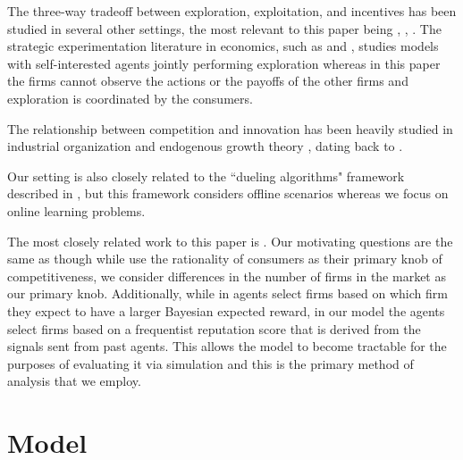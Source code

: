 \documentclass{article}
\theoremstyle{definition}
\begin{document}
The three-way tradeoff between exploration, exploitation, and incentives has been studied in several other settings, the most relevant to this paper being \citealt*{che2017recommender}, \citealt*{kremer2014implementing}, \citealt*{mansour2015bayesian}. The strategic experimentation literature in economics, such as \citealt*{bolton1999strategic} and \citealt*{keller2005strategic}, studies models with self-interested agents jointly performing exploration whereas in this paper the firms cannot observe the actions or the payoffs of the other firms and exploration is coordinated by the consumers.

The relationship between competition and innovation has been heavily studied in industrial organization \citep{tirole1988theory} and endogenous growth theory \citep{aghion2005competition, barro2004economic}, dating back to \citet{schumpeter2010capitalism}. 

Our setting is also closely related to the ``dueling algorithms" framework described in \cite{immorlica2011dueling}, but this framework considers offline scenarios whereas we focus on online learning problems.

The most closely related work to this paper is \citealt*{mansour2018competing}. Our motivating questions are the same as \citet{mansour2018competing} though while \citet{mansour2018competing} use the rationality of consumers as their primary knob of competitiveness, we consider differences in the number of firms in the market as our primary knob. Additionally, while in \citet{mansour2018competing} agents select firms based on which firm they expect to have a larger Bayesian expected reward, in our model the agents select firms based on a frequentist reputation score that is derived from the signals sent from past agents. This allows the model to become tractable for the purposes of evaluating it via simulation and this is the primary method of analysis that we employ.

\section{Model}
\label{model}
\end{document}
